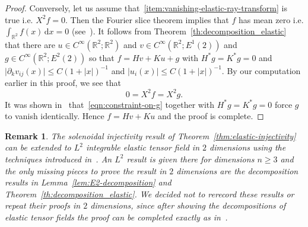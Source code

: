 \documentclass[11pt]{article}
\newcommand{\abs}[1]{\lvert #1 \rvert}
\renewcommand{\d}{\mathrm{d}}
\newtheorem{remark}[theorem]{Remark}
\begin{document}
\begin{proof}
Conversely, let us assume that~\ref{item:vanishing-elastic-ray-transform} is true i.e. $X^2f = 0$. Then the Fourier slice theorem implies that $f$ has mean zero i.e. $\int_{\mathbb{R}^2}f(x)\,\d x = 0$ (see~\cite[Lemma 7]{ilmavirta2025elasticraytransform}). It follows from Theorem~\ref{th:decomposition_elastic} that there are $u \in C^\infty(\mathbb{R}^2;\mathbb{R}^2)$ and $v \in C^\infty(\mathbb{R}^2;E^1(2))$ and $g \in C^\infty(\mathbb{R}^2;E^2(2))$ so that $f = Hv + Ku + g$ with $H^*g = K^*g = 0$ and $\abs{\partial_kv_{ij}(x)} \leq C(1 + \abs{x})^{-1}$ and $\abs{u_i(x)} \leq C(1 + \abs{x})^{-1}$. By our computation earlier in this proof, we see that
\begin{equation}
\label{eqn:constraint-on-g}
0
=
X^2f
=
X^2g.
\end{equation}
It was shown in~\cite{ilmavirta2025elasticraytransform} that~\eqref{eqn:constraint-on-g} together with $H^*g = K^*g = 0$ force $g$ to vanish identically. Hence $f = Hv + Ku$ and the proof is complete.
\end{proof}

\begin{remark}
The solenoidal injectivity result of Theorem~\ref{thm:elastic-injectivity} can be extended to $L^2$ integrable elastic tensor field in $2$ dimensions using the techniques introduced in~\cite{ilmavirta2025elasticraytransform}. An $L^2$ result is given there for dimensions $n \geq 3$ and the only missing pieces to prove the result in $2$ dimensions are the decomposition results in Lemma~\ref{lem:E2-decomposition} and Theorem~\ref{th:decomposition_elastic}. We decided not to rerecord these results or repeat their proofs in $2$ dimensions, since after showing the decompositions of elastic tensor fields the proof can be completed exactly as in~\cite{ilmavirta2025elasticraytransform}.
\end{remark}
\end{document}
